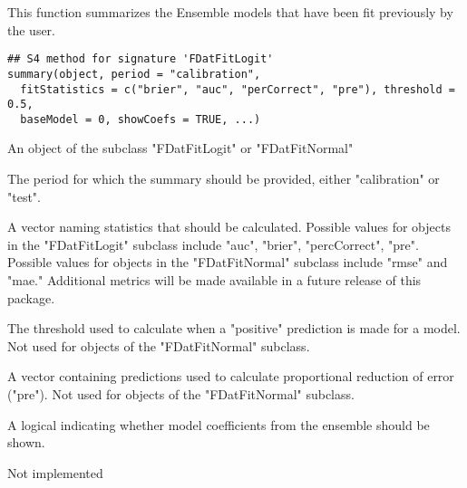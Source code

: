 \documentclass[a4paper]{book}
\begin{document}
%
\begin{Description}\relax
This function summarizes the Ensemble models that have been fit previously by the user.
\end{Description}
%
\begin{Usage}
\begin{verbatim}
## S4 method for signature 'FDatFitLogit'
summary(object, period = "calibration",
  fitStatistics = c("brier", "auc", "perCorrect", "pre"), threshold = 0.5,
  baseModel = 0, showCoefs = TRUE, ...)
\end{verbatim}
\end{Usage}
%
\begin{Arguments}
\begin{ldescription}
\item[\code{object}] An object of the subclass "FDatFitLogit" or "FDatFitNormal"

\item[\code{period}] The period for which the summary should be provided, either "calibration" or "test".

\item[\code{fitStatistics}] A vector naming statistics that should be calculated.  Possible values for objects in the "FDatFitLogit" subclass include "auc", "brier", "percCorrect", "pre". Possible values for objects in the "FDatFitNormal" subclass include "rmse" and "mae."  Additional metrics will be made available in a future release of this package.

\item[\code{threshold}] The threshold used to calculate when a "positive" prediction is made for a model.  Not used for objects of the "FDatFitNormal" subclass.

\item[\code{baseModel}] A vector containing predictions used to calculate proportional reduction of error ("pre"). Not used for objects of the "FDatFitNormal" subclass.

\item[\code{showCoefs}] A logical indicating whether model coefficients from the ensemble should be shown.

\item[\code{...}] Not implemented
\end{ldescription}
\end{Arguments}
\end{document}
